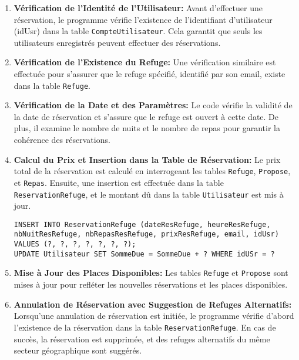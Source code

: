 \begin{enumerate}
    
    \item \textbf{Vérification de l'Identité de l'Utilisateur:} Avant d'effectuer une réservation, le programme vérifie l'existence de l'identifiant d'utilisateur (idUsr) dans la table \texttt{CompteUtilisateur}. Cela garantit que seuls les utilisateurs enregistrés peuvent effectuer des réservations.

    \item \textbf{Vérification de l'Existence du Refuge:} Une vérification similaire est effectuée pour s'assurer que le refuge spécifié, identifié par son email, existe dans la table \texttt{Refuge}.

    \item \textbf{Vérification de la Date et des Paramètres:} Le code vérifie la validité de la date de réservation et s'assure que le refuge est ouvert à cette date. De plus, il examine le nombre de nuits et le nombre de repas pour garantir la cohérence des réservations.

    \item \textbf{Calcul du Prix et Insertion dans la Table de Réservation:} Le prix total de la réservation est calculé en interrogeant les tables \texttt{Refuge}, \texttt{Propose}, et \texttt{Repas}. Ensuite, une insertion est effectuée dans la table \texttt{ReservationRefuge}, et le montant dû dans la table \texttt{Utilisateur} est mis à jour.

    \begin{lstlisting}[style=SQL, label=sql-e]
INSERT INTO ReservationRefuge (dateResRefuge, heureResRefuge, nbNuitResRefuge, nbRepasResRefuge, prixResRefuge, email, idUsr) VALUES (?, ?, ?, ?, ?, ?, ?);
UPDATE Utilisateur SET SommeDue = SommeDue + ? WHERE idUSr = ?
    \end{lstlisting}

    \item \textbf{Mise à Jour des Places Disponibles:} Les tables \texttt{Refuge} et \texttt{Propose} sont mises à jour pour refléter les nouvelles réservations et les places disponibles.

    \item \textbf{Annulation de Réservation avec Suggestion de Refuges Alternatifs:} Lorsqu'une annulation de réservation est initiée, le programme vérifie d'abord l'existence de la réservation dans la table \texttt{ReservationRefuge}. En cas de succès, la réservation est supprimée, et des refuges alternatifs du même secteur géographique sont suggérés.
    
\end{enumerate}
 

